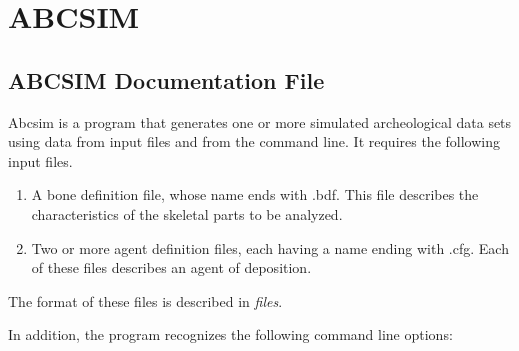 
\section{ABCSIM}%

\subsection*{ABCSIM Documentation File}%

Abcsim is a program that generates one or more simulated archeological
data sets using data from input files and from the command line.  It
requires the following input files.

\begin{enumerate}

\item
A bone definition file, whose name ends with .bdf.  This file
describes the characteristics of the skeletal parts to be analyzed.

\item
Two or more agent definition files, each having a name ending with
.cfg.  Each of these files describes an agent of deposition.

\end{enumerate}

The format of these files is described in {\em files\/}.

In addition, the program recognizes the following command line
options:

